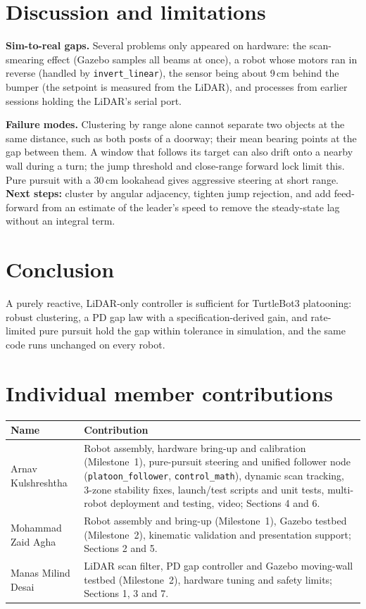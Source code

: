 \documentclass[11pt,a4paper,twocolumn]{article}
\begin{document}
\section{Discussion and limitations}
\textbf{Sim-to-real gaps.} Several problems only appeared on hardware: the scan-smearing
effect (Gazebo samples all beams at once), a robot whose motors ran in reverse (handled by
\texttt{invert\_linear}), the sensor being about 9\,cm behind the bumper (the setpoint is
measured from the LiDAR), and processes from earlier sessions holding the LiDAR's serial port.

\textbf{Failure modes.} Clustering by range alone cannot separate two objects at the same
distance, such as both posts of a doorway; their mean bearing points at the gap between them.
A window that follows its target can also drift onto a nearby wall during a turn; the jump
threshold and close-range forward lock limit this. Pure pursuit with a 30\,cm lookahead gives
aggressive steering at short range. \textbf{Next steps:} cluster by angular adjacency,
tighten jump rejection, and add feed-forward from an estimate of the leader's speed to
remove the steady-state lag without an integral term.

\section{Conclusion}
A purely reactive, LiDAR-only controller is sufficient for TurtleBot3 platooning: robust
clustering, a PD gap law with a specification-derived gain, and rate-limited pure pursuit hold
the gap within tolerance in simulation, and the same code runs unchanged on every robot.

\section*{Individual member contributions}
{\small
\begin{tabularx}{\linewidth}{@{}l X@{}}
\toprule
Name & Contribution \\
\midrule
Arnav Kulshreshtha & Robot assembly, hardware bring-up and calibration (Milestone~1),
pure-pursuit steering and unified follower node (\texttt{platoon\_follower},
\texttt{control\_math}), dynamic scan tracking, 3-zone stability fixes, launch/test
scripts and unit tests, multi-robot deployment and testing, video; Sections 4 and 6. \\
Mohammad Zaid Agha & Robot assembly and bring-up (Milestone~1), Gazebo testbed
(Milestone~2), kinematic validation and presentation support; Sections 2 and 5. \\
Manas Milind Desai & LiDAR scan filter, PD gap controller and Gazebo moving-wall testbed
(Milestone~2), hardware tuning and safety limits; Sections 1, 3 and 7. \\
\bottomrule
\end{tabularx}}
\end{document}
